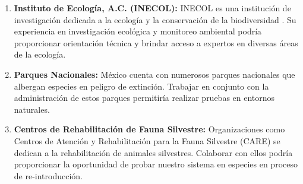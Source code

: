 \begin{enumerate}
\item \textbf{Instituto de Ecología, A.C. (INECOL):} INECOL es una institución de investigación dedicada a la ecología y la conservación de la biodiversidad \cite{INECOL}. Su experiencia en investigación ecológica y monitoreo ambiental podría proporcionar orientación técnica y brindar acceso a expertos en diversas áreas de la ecología.

\item \textbf{Parques Nacionales: }México cuenta con numerosos parques nacionales que albergan especies en peligro de extinción. Trabajar en conjunto con la administración de estos parques permitiría realizar pruebas en entornos naturales.

\item \textbf{Centros de Rehabilitación de Fauna Silvestre:} Organizaciones como Centros de Atención y Rehabilitación para la Fauna Silvestre (CARE) se dedican a la rehabilitación de animales silvestres. Colaborar con ellos podría proporcionar la oportunidad de probar nuestro sistema en especies en proceso de re-introducción.

\end{enumerate}


